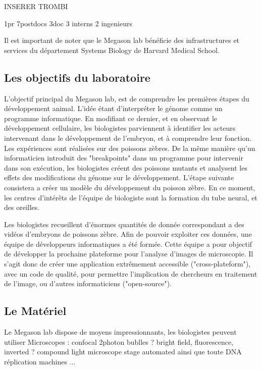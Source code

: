 INSERER TROMBI

1pr
7postdocs
3doc
3 interns
2 ingenieurs

Il est important de noter que le Megason lab bénéficie des infrastructures et services du département Systems Biology de Harvard Medical School.


\subsection{Les objectifs du laboratoire}
L'objectif principal du Megason lab, est de comprendre les premières étapes du développement animal.
L'idée étant d'interpréter le génome comme un programme informatique. En modifiant ce dernier, et en observant le développement cellulaire, les biologistes parviennent à identifier les acteurs intervenant dans le développement de l'embryon, et à comprendre leur fonction.
Les expériences sont réalisées sur des poissons zèbres. De la même manière qu'un informaticien introduit des "breakpoints" dans un programme pour intervenir dans son exécution, les biologistes créent des poissons mutants et analysent les effets des modifications du génome sur le développement.
L'étape suivante consistera a créer un modèle du développement du poisson zèbre. En ce moment, les centres d'intérêts de l'équipe de biologiste sont la formation du tube neural, et des oreilles.

Les biologistes recueillent d'énormes quantités de donnée correspondant a des vidéos d'embryons de poissons zèbre. Afin de pouvoir exploiter ces données, une équipe de développeurs informatiques a été formée. Cette équipe a pour objectif de développer la prochaine plateforme pour l'analyse d'images de microscopie. Il s'agit donc de créer une application extrêmement accessible ("cross-plateform"), avec un code de qualité, pour permettre l'implication de chercheurs en traitement de l'image, ou d'autres informaticiens ("open-source").

\subsection{Le Matériel} 
Le Megason lab dispose de moyens impressionnants, les biologistes peuvent utiliser
Microscopes :
confocal 2photon
bublles ? bright field, fluorescence, inverted ? compound light microscope stage automated
ainsi que toute 
DNA réplication machines ...



%







